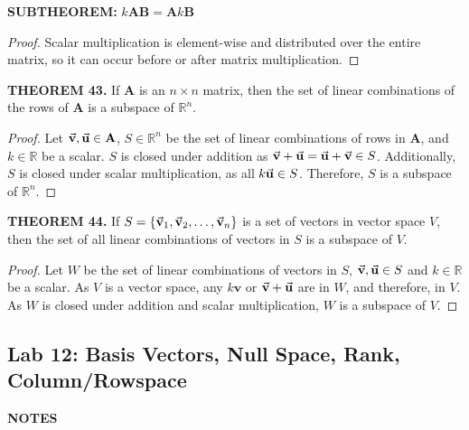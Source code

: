 \documentclass[12pt]{article}
\newcommand{\mat}[1]{\mathbf{#1}}
\newcommand{\theorem}[2]{\textbf{THEOREM #1.} #2}
\newcommand{\notes}{\textbf{NOTES}}
\newcommand{\subtheorem}[1]{\textbf{SUBTHEOREM:} #1}
\begin{document}
\subtheorem{$k\mat{A} \mat{B} = \mat{A} k \mat{B}$}

\begin{proof}
Scalar multiplication is element-wise and distributed over the entire matrix, so it can occur before or after matrix multiplication. 
\end{proof}

\theorem{43}{If $\mat{A}$ is an $n \times n$ matrix, then the set of linear combinations of the rows of $\mat{A}$ is a subspace of $\mathbb{R}^{n}$.}

\begin{proof}
Let $\va{v}, \va{u} \in \mat{A}$, $S \in \mathbb{R}^{n}$ be the set of linear combinations of rows in $\mat{A}$, and $k \in \mathbb{R}$ be a scalar. $S$ is closed under addition as $\va{v} + \va{u} = \va{u} + \va{v} \in S$. Additionally, $S$ is closed under scalar multiplication, as all $k\va{u} \in S$. Therefore, $S$ is a subspace of $\mathbb{R}^{n}$.
\end{proof}

\theorem{44}{If $S = \{ \va{v}_1, \va{v}_2, \dots, \va{v}_n \}$ is a set of vectors in vector space $V$, then the set of all linear combinations of vectors in $S$ is a subspace of $V$.}

\begin{proof}
Let $W$ be the set of linear combinations of vectors in $S$, $\va{v}, \va{u} \in S$ and $k \in \mathbb{R}$ be a scalar. As $V$ is a vector space, any $k\mat{v}$ or $\va{v} + \va{u}$ are in $W$, and therefore, in $V$. As $W$ is closed under addition and scalar multiplication, $W$ is a subspace of $V$.
\end{proof}

\subsection{Lab 12: Basis Vectors, Null Space, Rank, Column/Rowspace}

\notes
\end{document}
